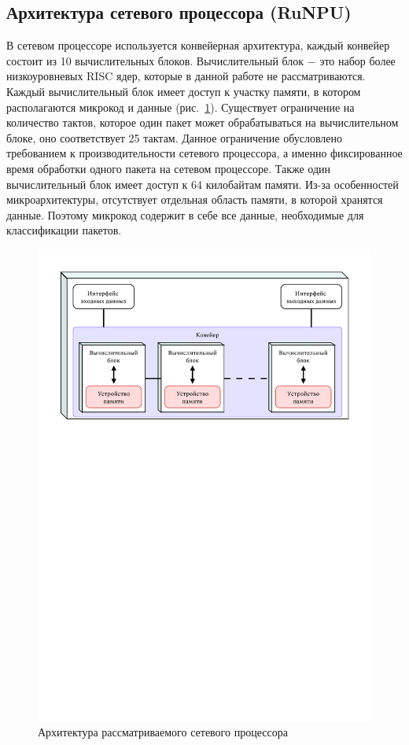 \documentclass[oneside,final,12pt]{extarticle}
\begin{document}
        \subsection{Архитектура сетевого процессора (RuNPU)}
            \label{sect:arch}
            В сетевом процессоре используется конвейерная архитектура, каждый конвейер состоит из 10 вычислительных блоков. 
            Вычислительный блок $-$ это набор более низкоуровневых RISC ядер, которые в данной работе не рассматриваются. 
            Каждый вычислительный блок имеет доступ к участку памяти, в котором располагаются микрокод и данные (рис.~\ref{img:npu_arch}).
            Существует ограничение на количество тактов, которое один пакет может обрабатываться на вычислительном блоке, оно соответствует 25 тактам.
            Данное ограничение обусловлено требованием к производительности сетевого процессора, а именно фиксированное время обработки одного пакета на сетевом процессоре.
            Также один вычислительный блок имеет доступ к 64 килобайтам памяти.
            Из-за особенностей микроархитектуры, отсутствует отдельная область памяти, в которой хранятся данные. Поэтому микрокод содержит в себе все данные,
            необходимые для классификации пакетов.

            \begin{figure}[h]
                \centering
                \includegraphics[trim=0 1000 0 0,clip,width=\textwidth]{npu.pdf}
                \caption{Архитектура рассматриваемого сетевого процессора}
                \label{img:npu_arch}
            \end{figure}
            
\end{document}
